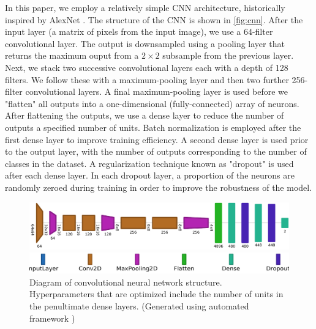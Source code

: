 \documentclass[Journal,letterpaper, SingleSpace, InsideFigs]{ascelike-new}
\begin{document}
In this paper, we employ a relatively simple CNN architecture, historically inspired by AlexNet \cite{krizhevsky2012imageneta}.
The structure of the CNN is shown in \autoref{fig:cnn}.
After the input layer (a matrix of pixels from the input image), we use a 64-filter convolutional layer.
The output is downsampled using a pooling layer that returns the maximum ouput from a $2\times 2$ subsample from the previous layer.
Next, we stack two successive convolutional layers each with a depth of 128 filters.
We follow these with a maximum-pooling layer and then two further 256-filter convolutional layers.
A final maximum-pooling layer is used before we "flatten" all outputs into a one-dimensional (fully-connected) array of neurons. 
After flattening the outputs, we use a dense layer to reduce the number of outputs a specified number of units.
Batch normalization \cite{ioffe2015batch} is employed after the first dense layer to improve training efficiency.
A second dense layer is used prior to the output layer, with the number of outputs corresponding to the number of classes in the dataset.
A regularization technique known as "dropout" is used after each dense layer.
In each dropout layer, a proportion of the neurons are randomly zeroed during training in order to improve the robustness of the model.
\begin{figure}
    \centering
    \includegraphics[width=.9\textwidth]{net2vis/graph.pdf}
    
    \medskip
    
    \includegraphics[width=.7\textwidth]{figures/net2vis-name-labels/legend}
    \caption{Diagram of convolutional neural network structure. Hyperparameters that are optimized include the number of units in the penultimate dense layers. (Generated using automated framework \cite{bauerle2021net2vis})}
    \label{fig:cnn}
\end{figure}
\end{document}
